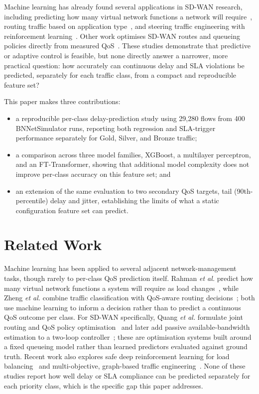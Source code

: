 \documentclass[conference]{IEEEtran}
\begin{document}
Machine learning has already found several applications in SD-WAN research, including predicting how many virtual network functions a network will require~\cite{rahman2019autoscaling}, routing traffic based on application type~\cite{zheng2022applicationaware}, and steering traffic engineering with reinforcement learning~\cite{dinh2024safeloadbalancing,chen2025mteal}. Other work optimises SD-WAN routes and queueing policies directly from measured QoS~\cite{quang2022routing,quang2023globalqos}. These studies demonstrate that predictive or adaptive control is feasible, but none directly answer a narrower, more practical question: how accurately can continuous delay and SLA violations be predicted, separately for each traffic class, from a compact and reproducible feature set?

This paper makes three contributions:
\begin{itemize}
    \item a reproducible per-class delay-prediction study using 29,280 flows from 400 BNNetSimulator runs, reporting both regression and SLA-trigger performance separately for Gold, Silver, and Bronze traffic;
    \item a comparison across three model families, XGBoost, a multilayer perceptron, and an FT-Transformer, showing that additional model complexity does not improve per-class accuracy on this feature set; and
    \item an extension of the same evaluation to two secondary QoS targets, tail (90th-percentile) delay and jitter, establishing the limits of what a static configuration feature set can predict.
\end{itemize}

\section{Related Work}

Machine learning has been applied to several adjacent network-management tasks, though rarely to per-class QoS prediction itself. Rahman \emph{et al.} predict how many virtual network functions a system will require as load changes~\cite{rahman2019autoscaling}, while Zheng \emph{et al.} combine traffic classification with QoS-aware routing decisions~\cite{zheng2022applicationaware}; both use machine learning to inform a decision rather than to predict a continuous QoS outcome per class. For SD-WAN specifically, Quang \emph{et al.} formulate joint routing and QoS policy optimisation~\cite{quang2022routing} and later add passive available-bandwidth estimation to a two-loop controller~\cite{quang2023globalqos}; these are optimisation systems built around a fixed queueing model rather than learned predictors evaluated against ground truth. Recent work also explores safe deep reinforcement learning for load balancing~\cite{dinh2024safeloadbalancing} and multi-objective, graph-based traffic engineering~\cite{chen2025mteal}. None of these studies report how well delay or SLA compliance can be predicted separately for each priority class, which is the specific gap this paper addresses.
\end{document}

